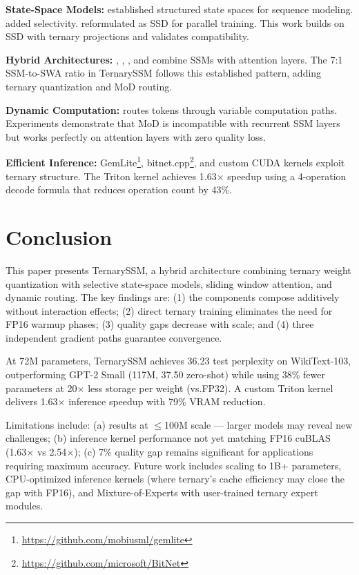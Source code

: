 \documentclass{article}
\begin{document}
\textbf{State-Space Models:} \citet{gu2022efficiently} established structured state spaces for sequence modeling. \citet{gu2024mamba} added selectivity. \citet{dao2024transformers} reformulated as SSD for parallel training. This work builds on SSD with ternary projections and validates compatibility.

\textbf{Hybrid Architectures:} \citet{jamba2024}, \citet{hymba2024}, \citet{pmlr2024samba}, and \citet{griffin2024model} combine SSMs with attention layers. The 7:1 SSM-to-SWA ratio in TernarySSM follows this established pattern, adding ternary quantization and MoD routing.

\textbf{Dynamic Computation:} \citet{raposo2024mixture} routes tokens through variable computation paths. Experiments demonstrate that MoD is incompatible with recurrent SSM layers but works perfectly on attention layers with zero quality loss.

\textbf{Efficient Inference:} GemLite\footnote{\url{https://github.com/mobiusml/gemlite}}, bitnet.cpp\footnote{\url{https://github.com/microsoft/BitNet}}, and custom CUDA kernels exploit ternary structure. The Triton kernel achieves 1.63$\times$ speedup using a 4-operation decode formula that reduces operation count by 43\%.

\section{Conclusion}

This paper presents TernarySSM, a hybrid architecture combining ternary weight quantization with selective state-space models, sliding window attention, and dynamic routing. The key findings are: (1) the components compose additively without interaction effects; (2) direct ternary training eliminates the need for FP16 warmup phases; (3) quality gaps decrease with scale; and (4) three independent gradient paths guarantee convergence.

At 72M parameters, TernarySSM achieves 36.23 test perplexity on WikiText-103, outperforming GPT-2 Small (117M, 37.50 zero-shot) while using 38\% fewer parameters at 20$\times$ less storage per weight (vs.\@ FP32). A custom Triton kernel delivers 1.63$\times$ inference speedup with 79\% VRAM reduction.

Limitations include: (a) results at $\leq$100M scale --- larger models may reveal new challenges; (b) inference kernel performance not yet matching FP16 cuBLAS (1.63$\times$ vs 2.54$\times$); (c) 7\% quality gap remains significant for applications requiring maximum accuracy. Future work includes scaling to 1B+ parameters, CPU-optimized inference kernels (where ternary's cache efficiency may close the gap with FP16), and Mixture-of-Experts with user-trained ternary expert modules.



\end{document}

